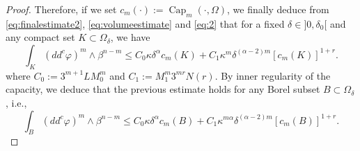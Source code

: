 \documentclass[11pt]{article}
\newcommand{\ie}{i.e.,\xspace}
\numberwithin{equation}{section}
\theoremstyle{definition}
\DeclareMathOperator{\Capa}{Cap}
\theoremstyle{plain}
\theoremstyle{definition}
\begin{document}
\begin{proof}
Therefore, if we set $c_m (\cdot):= \Capa_m (\cdot,\Omega)$, we finally deduce from \eqref{eq:finalestimate2}, \eqref{eq:volumeestimate} and \eqref{eq:2} that for a fixed $\delta\in{}]0,\delta_0[$ and any compact set $K \subset \Omega_\delta$, we have
\begin{equation}
\int_K (dd^c\varphi)^m\wedge\beta^{n-m} \leq C_0\kappa \delta^{\alpha} c_m (K) + C_1 \kappa^m \delta^{(\alpha -2) m } [c_m(K)]^{1+ r}.
\end{equation}
where $C_0:= 3^{m + 1} L M_0^m$ and $C_1:= M_1^{m} 3^{m r} N (r)$. By inner regularity of the capacity, we deduce that the previous estimate holds for any Borel subset $B \subset \Omega_\delta$, \ie \begin{equation} \label{eq:estimate1}
\int_B (dd^c\varphi)^m\wedge\beta^{n-m} \leq C_0 \kappa \delta^{\alpha} c_m (B) + C_1 \kappa^{m \alpha } \delta^{(\alpha -2) m} [c_m(B)]^{1+r}.
\end{equation}


\end{proof}
\end{document}
